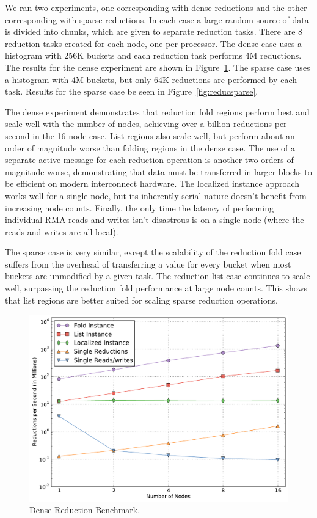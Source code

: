 We ran two experiments, one corresponding with dense reductions and the other corresponding with sparse
reductions.  In each case a large random source of data is divided into chunks, which are given to
separate reduction tasks.  There are 8 reduction tasks created for each node, one per processor.  The dense
case uses a histogram with 256K buckets and each reduction task performs 4M reductions.  The results for the
dense experiment are shown in Figure~\ref{fig:reducdense}.  The sparse case uses a histogram with 4M buckets,
but only 64K reductions are performed by each task.  Results for the sparse case
be seen in Figure~\ref{fig:reducsparse}.

The dense experiment demonstrates that reduction fold regions perform 
best and scale well with the number of nodes, achieving over a billion reductions
per second in the 16 node case.  List regions also scale well, but perform about an
order of magnitude worse than folding regions in the dense case.  The use of a separate active message for
each reduction operation is another two orders of magnitude worse, demonstrating that data must be
transferred in larger blocks to be efficient on modern interconnect hardware.  The localized instance approach
works well for a single node, but its inherently serial nature doesn't benefit from increasing node counts.  Finally, the only time the latency of performing individual RMA reads and writes isn't disastrous is
on a single node (where the reads and writes are all local).

The sparse case is very similar, except the scalability of the reduction fold case suffers from the
overhead of transferring a value for every bucket when most buckets are unmodified by a given task.
The reduction list case continues to scale well, surpassing the reduction fold performance at large
node counts.  This shows that
list regions are better suited for scaling sparse reduction operations.

\begin{figure}
\begin{center}
\includegraphics[scale=0.33]{figs/reduce_dense.pdf}
\end{center}
\vspace{-6mm}
\caption{Dense Reduction Benchmark.\label{fig:reducdense}}
\vspace{-4mm}
\end{figure}

